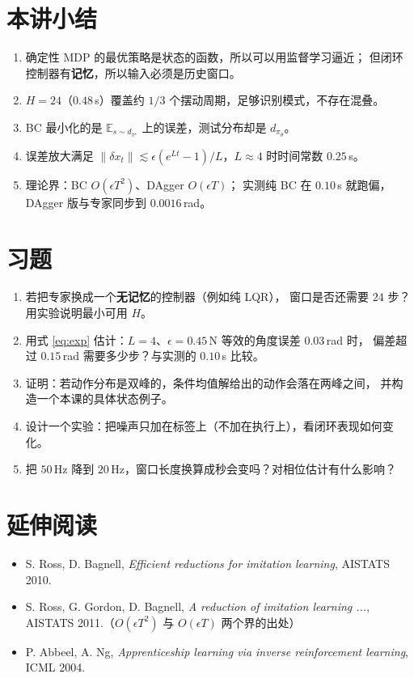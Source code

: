 \section{本讲小结}
\begin{enumerate}[leftmargin=2em,itemsep=2pt]
  \item 确定性 MDP 的最优策略是状态的函数，所以可以用监督学习逼近；
        但闭环控制器有\textbf{记忆}，所以输入必须是历史窗口。
  \item $H=24$（$0.48$\,s）覆盖约 $1/3$ 个摆动周期，足够识别模式，不存在混叠。
  \item BC 最小化的是 $\mathbb{E}_{s\sim d_{\pi^\star}}$ 上的误差，测试分布却是 $d_{\pi_\theta}$。
  \item 误差放大满足 $\|\delta x_t\|\lesssim \epsilon(e^{Lt}-1)/L$，$L\approx4$ 时时间常数 $0.25$\,s。
  \item 理论界：BC $O(\epsilon T^2)$、DAgger $O(\epsilon T)$；
        实测纯 BC 在 $0.10$\,s 就跑偏，DAgger 版与专家同步到 $0.0016$\,rad。
\end{enumerate}

\section*{习题}
\begin{enumerate}[leftmargin=2em,itemsep=6pt]
  \item 若把专家换成一个\textbf{无记忆}的控制器（例如纯 LQR），
        窗口是否还需要 $24$ 步？用实验说明最小可用 $H$。
  \item 用式 \eqref{eq:exp} 估计：$L=4$、$\epsilon=0.45$\,N 等效的角度误差 $0.03$\,rad 时，
        偏差超过 $0.15$\,rad 需要多少步？与实测的 $0.10$\,s 比较。
  \item 证明：若动作分布是双峰的，条件均值解给出的动作会落在两峰之间，
        并构造一个本课的具体状态例子。
  \item 设计一个实验：把噪声只加在标签上（不加在执行上），看闭环表现如何变化。
  \item 把 $50$\,Hz 降到 $20$\,Hz，窗口长度换算成秒会变吗？对相位估计有什么影响？
\end{enumerate}

\section*{延伸阅读}
\begin{itemize}[leftmargin=2em,itemsep=2pt]
  \item S. Ross, D. Bagnell, \emph{Efficient reductions for imitation learning}, AISTATS 2010.
  \item S. Ross, G. Gordon, D. Bagnell, \emph{A reduction of imitation learning ...},
        AISTATS 2011.（$O(\epsilon T^2)$ 与 $O(\epsilon T)$ 两个界的出处）
  \item P. Abbeel, A. Ng, \emph{Apprenticeship learning via inverse reinforcement learning}, ICML 2004.
\end{itemize}
